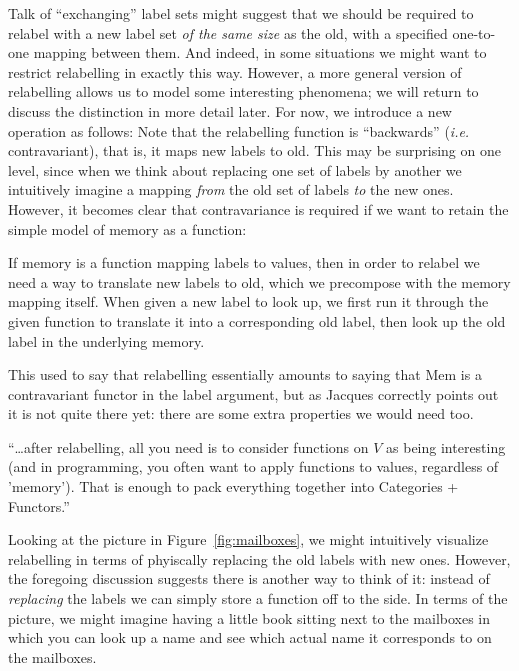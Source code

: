 \documentclass{jfp}
\begin{document}
Talk of ``exchanging'' label sets might suggest that we should be
required to relabel with a new label set \emph{of the same size} as
the old, with a specified one-to-one mapping between them.  And
indeed, in some situations we might want to restrict relabelling in
exactly this way.  However, a more general version of relabelling
allows us to model some interesting phenomena; we will return to
discuss the distinction in more detail later.  For now, we introduce a
new  operation as follows:
 Note that the
relabelling function is ``backwards'' (\emph{i.e.} contravariant),
that is, it maps new labels to old.  This may be surprising on one
level, since when we think about replacing one set of labels by
another we intuitively imagine a mapping \emph{from} the old set of
labels \emph{to} the new ones. However, it becomes clear that
contravariance is required if we want to retain the simple model of
memory as a function:


If memory is a function mapping labels to values, then in order to
relabel we need a way to translate new labels to old, which we
precompose with the memory mapping itself.  When given a new label to
look up, we first run it through the given function to translate it
into a corresponding old label, then look up the old label in the
underlying memory.

\begin{commentary}
  This used to say that relabelling essentially amounts to saying that
  Mem is a contravariant functor in the label argument, but as Jacques
  correctly points out it is not quite there yet: there are some extra
  properties we would need too.

  ``\dots after relabelling, all you need is to consider functions on
  $V$ as being interesting (and in programming, you often want to
  apply functions to values, regardless of 'memory'). That is enough
  to pack everything together into Categories + Functors.''
\end{commentary}

Looking at the picture in Figure~\ref{fig:mailboxes}, we might intuitively
visualize relabelling in terms of phyiscally replacing the old labels
with new ones. However, the foregoing discussion suggests there is
another way to think of it: instead of \emph{replacing} the labels we
can simply store a function off to the side.  In terms of the picture,
we might imagine having a little book sitting next to the mailboxes in
which you can look up a name and see which actual name it corresponds
to on the mailboxes.
\end{document}
